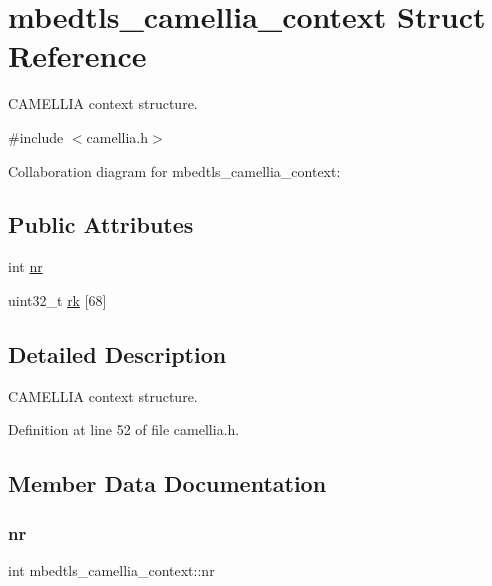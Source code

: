 \hypertarget{structmbedtls__camellia__context}{}\section{mbedtls\+\_\+camellia\+\_\+context Struct Reference}
\label{structmbedtls__camellia__context}


C\+A\+M\+E\+L\+L\+IA context structure.  




{\ttfamily \#include $<$camellia.\+h$>$}



Collaboration diagram for mbedtls\+\_\+camellia\+\_\+context\+:
\subsection*{Public Attributes}
\begin{DoxyCompactItemize}
\item 
int \mbox{\hyperlink{structmbedtls__camellia__context_a63d45ee2d45dfd67ef01ad9c1ca9c8d8}{nr}}
\item 
uint32\+\_\+t \mbox{\hyperlink{structmbedtls__camellia__context_ab5d709c14cdfa36ac163bfd973324f19}{rk}} \mbox{[}68\mbox{]}
\end{DoxyCompactItemize}


\subsection{Detailed Description}
C\+A\+M\+E\+L\+L\+IA context structure. 

Definition at line 52 of file camellia.\+h.



\subsection{Member Data Documentation}
\mbox{\label{structmbedtls__camellia__context_a63d45ee2d45dfd67ef01ad9c1ca9c8d8}} 
\subsubsection{\texorpdfstring{nr}{nr}}
{\footnotesize\ttfamily int mbedtls\+\_\+camellia\+\_\+context\+::nr}

